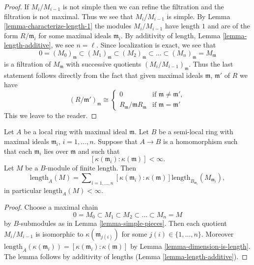 \begin{proof}
If $M_i/M_{i-1}$ is not simple then we can refine the filtration
and the filtration is not maximal. Thus we see that $M_i/M_{i-1}$
is simple. By Lemma \ref{lemma-characterize-length-1} the modules
$M_i/M_{i-1}$ have length $1$ and are of the form $R/\mathfrak m_i$
for some maximal ideals $\mathfrak m_i$. By additivity of length,
Lemma \ref{lemma-length-additive}, we see $n = \ell$. Since localization
is exact, we see that
$$
0 = (M_0)_{\mathfrak m}
\subset (M_1)_{\mathfrak m}
\subset (M_2)_{\mathfrak m}
\subset \ldots
\subset (M_n)_{\mathfrak m} = M_{\mathfrak m}
$$
is a filtration of $M_{\mathfrak m}$ with successive quotients
$(M_i/M_{i-1})_{\mathfrak m}$. Thus the last statement follows
directly from the fact that given maximal ideals $\mathfrak m$,
$\mathfrak m'$ of $R$ we have
$$
(R/\mathfrak m')_{\mathfrak m}
\cong
\left\{
\begin{matrix}
0 &
\text{if } \mathfrak m \not = \mathfrak m', \\
R_{\mathfrak m}/\mathfrak m R_{\mathfrak m} &
\text{if } \mathfrak m  = \mathfrak m'
\end{matrix}
\right.
$$
This we leave to the reader.
\end{proof}

\begin{lemma}
\label{lemma-pushdown-module}
Let $A$ be a local ring with maximal ideal $\mathfrak m$.
Let $B$ be a semi-local ring with maximal ideals $\mathfrak m_i$,
$i = 1, \ldots, n$.
Suppose that $A \to B$ is a homomorphism such that each $\mathfrak m_i$
lies over $\mathfrak m$ and such that
$$
[\kappa(\mathfrak m_i) : \kappa(\mathfrak m)] < \infty.
$$
Let $M$ be a $B$-module of finite length.
Then
$$
\text{length}_A(M) = \sum\nolimits_{i = 1, \ldots, n}
[\kappa(\mathfrak m_i) : \kappa(\mathfrak m)]
\text{length}_{B_{\mathfrak m_i}}(M_{\mathfrak m_i}),
$$
in particular $\text{length}_A(M) < \infty$.
\end{lemma}

\begin{proof}
Choose a maximal chain
$$
0 = M_0
\subset M_1
\subset M_2
\subset \ldots
\subset M_n = M
$$
by $B$-submodules as in Lemma \ref{lemma-simple-pieces}.
Then each quotient $M_i/M_{i - 1}$ is isomorphic to
$\kappa(\mathfrak m_{j(i)})$ for some $j(i) \in \{1, \ldots, n\}$.
Moreover
$\text{length}_A(\kappa(\mathfrak m_i)) =
[\kappa(\mathfrak m_i) : \kappa(\mathfrak m)]$ by
Lemma \ref{lemma-dimension-is-length}. The lemma follows
by additivity of lengths (Lemma \ref{lemma-length-additive}).
\end{proof}

